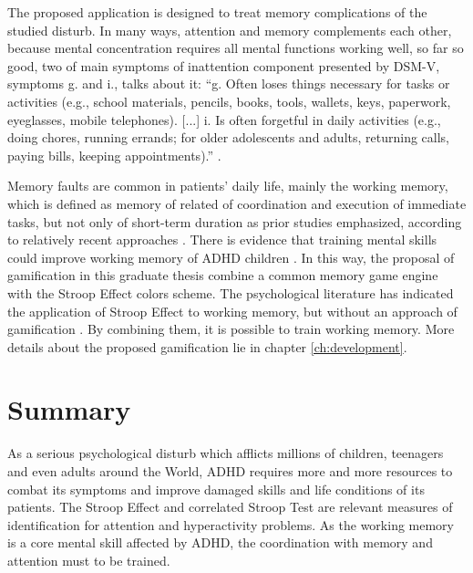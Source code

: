 The proposed application is designed to treat memory complications of the studied disturb. In many ways, attention and memory complements each other, because mental concentration requires all mental functions working well, so far so good, two of main symptoms of inattention component presented by DSM-V, symptoms g. and i., talks about it: ``g. Often loses things necessary for tasks or activities (e.g., school materials, pencils, books, tools, wallets, keys, paperwork, eyeglasses, mobile telephones).  [...] i. Is often forgetful in daily activities (e.g., doing chores, running errands; for older adolescents and adults, returning calls, paying bills, keeping appointments).'' \cite{dsm-american}.

Memory faults are common in patients' daily life, mainly the working memory, which is defined as memory of related of coordination and execution of immediate tasks, but not only of short-term duration as prior studies emphasized, according to relatively recent approaches \citep{working_memory}. There is evidence that training mental skills could improve working memory of ADHD children \citep{adhd_memory}. In this way, the proposal of gamification in this graduate thesis combine a common memory game engine with the Stroop Effect colors scheme. The psychological literature has indicated the application  of Stroop Effect to working memory, but without an approach of gamification \citep{Debr-2002}. By combining them, it is possible to train working memory. More details about the proposed gamification lie in chapter \ref{ch:development}.





\section{Summary}



As a serious psychological disturb which afflicts millions of children, teenagers and even adults around the World, ADHD requires more and more resources to combat its symptoms and improve damaged skills and life conditions of its patients. The Stroop Effect and correlated Stroop Test are relevant measures of identification for attention and hyperactivity problems. As the working memory is a core mental skill affected by ADHD, the coordination with memory and attention must to be trained.
